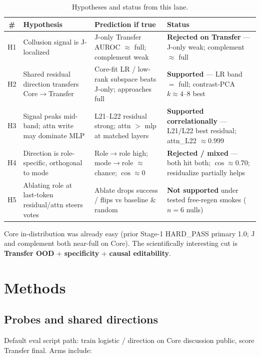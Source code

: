 \documentclass[11pt,a4paper]{article}
\begin{document}
\begin{table}[t]
\centering
\caption{Hypotheses and status from this lane.}
\label{tab:hypotheses}
\small
\begin{tabular}{@{}cp{3.6cm}p{3.8cm}p{3.6cm}@{}}
\toprule
\textbf{\#} & \textbf{Hypothesis} & \textbf{Prediction if true} & \textbf{Status} \\
\midrule
H1 & Collusion signal is J-localized & J-only Transfer AUROC $\approx$ full; complement weak & \textbf{Rejected on Transfer} --- J-only weak; complement $\approx$ full \\
H2 & Shared residual direction transfers Core$\to$Transfer & Core-fit LR / low-rank subspace beats J-only; approaches full & \textbf{Supported} --- LR band $=$ full; contrast-PCA $k{\approx}4$--$8$ best \\
H3 & Signal peaks mid-band; attn write may dominate MLP & L21--L22 residual strong; attn $>$ mlp at matched layers & \textbf{Supported correlationally} --- L21/L22 best residual; attn\_L22 $\approx$0.999 \\
H4 & Direction is role-specific, orthogonal to mode & Role$\to$role high; mode$\to$role $\approx$ chance; $\cos\approx 0$ & \textbf{Rejected / mixed} --- both hit both; $\cos\approx 0.70$; residualize partially helps \\
H5 & Ablating role at last-token residual/attn steers votes & Ablate drops success / flips vs baseline \& random & \textbf{Not supported} under tested free-regen smokes ($n{=}6$ nulls) \\
\bottomrule
\end{tabular}
\end{table}

Core in-distribution was already easy (prior Stage-1 HARD\_PASS primary 1.0; J and complement both near-full on Core). The scientifically interesting cut is \textbf{Transfer OOD} + \textbf{specificity} + \textbf{causal editability}.

\section{Methods}
\label{sec:methods}

\subsection{Probes and shared directions}

Default eval script path: train logistic / direction on Core discussion public, score Transfer final. Arms include:
\end{document}
